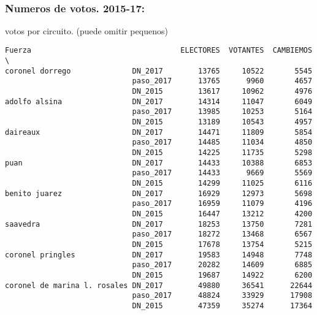 \documentclass[11pt]{article}
\begin{document}
    
    \begin{center}
    \end{center}
    { \hspace*{\fill} \\}
    
    \hypertarget{numeros-de-votos.-2015-17}{%
\subsubsection{Numeros de votos.
2015-17:}\label{numeros-de-votos.-2015-17}}

    
    votos por circuito. (puede omitir pequenos)

    
    
    \begin{verbatim}
Fuerza                                  ELECTORES  VOTANTES  CAMBIEMOS  \
coronel dorrego              DN_2017        13765     10522       5545   
                             paso_2017      13765      9960       4657   
                             DN_2015        13617     10962       4976   
adolfo alsina                DN_2017        14314     11047       6049   
                             paso_2017      13985     10253       5164   
                             DN_2015        13189     10543       4957   
daireaux                     DN_2017        14471     11809       5854   
                             paso_2017      14485     11034       4850   
                             DN_2015        14225     11735       5298   
puan                         DN_2017        14433     10388       6853   
                             paso_2017      14433      9669       5569   
                             DN_2015        14299     11025       6116   
benito juarez                DN_2017        16929     12973       5698   
                             paso_2017      16959     11079       4196   
                             DN_2015        16447     13212       4200   
saavedra                     DN_2017        18253     13750       7281   
                             paso_2017      18272     13468       6567   
                             DN_2015        17678     13754       5215   
coronel pringles             DN_2017        19583     14948       7748   
                             paso_2017      20282     14609       6885   
                             DN_2015        19687     14922       6200   
coronel de marina l. rosales DN_2017        49880     36541      22644   
                             paso_2017      48824     33929      17908   
                             DN_2015        47359     35274      17364   


\end{verbatim}
\end{document}
